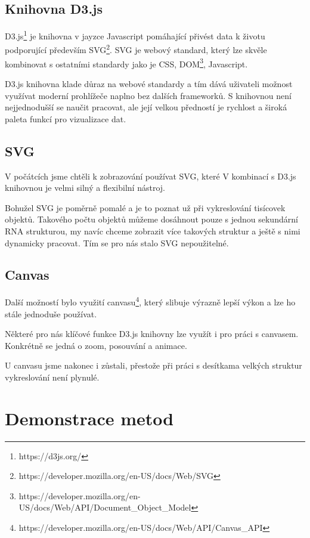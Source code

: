\subsection{Knihovna D3.js}

D3.js\footnote{https://d3js.org/} je knihovna v jayzce Javascript pomáhající
přivést data k životu podporující především
SVG\footnote{https://developer.mozilla.org/en-US/docs/Web/SVG}. SVG je webový
standard, který lze skvěle kombinovat s ostatními standardy jako je CSS,
DOM\footnote{https://developer.mozilla.org/en-US/docs/Web/API/Document\_Object\_Model},
Javascript.

D3.js knihovna klade důraz na webové standardy a tím dává uživateli možnost
využívat moderní prohlížeče naplno bez dalších frameworků. S knihovnou není
nejjednodušší se naučit pracovat, ale její velkou předností je rychlost a
široká paleta funkcí pro vizualizace dat.

\subsection{SVG}

V počátcích jsme chtěli k zobrazování používat SVG, které V kombinací s D3.js
knihovnou je velmi silný a flexibilní nástroj.

Bohužel SVG je poměrně pomalé a je to poznat už při vykreslování tisícovek
objektů. Takového počtu objektů můžeme dosáhnout pouze s jednou sekundární RNA
strukturou, my navíc chceme zobrazit více takových struktur a ještě s nimi
dynamicky pracovat. Tím se pro nás stalo SVG nepoužitelné.

\subsection{Canvas}

Další možností bylo využití
canvasu\footnote{https://developer.mozilla.org/en-US/docs/Web/API/Canvas\_API},
který slibuje výrazně lepší výkon a lze ho stále jednoduše používat.

Některé pro nás klíčové funkce D3.js knihovny lze využít i pro práci s
canvasem. Konkrétně se jedná o zoom, posouvání a animace.

U canvasu jsme nakonec i zůstali, přestože při práci s desítkama velkých
struktur vykreslování není plynulé.

\section{Demonstrace metod}

